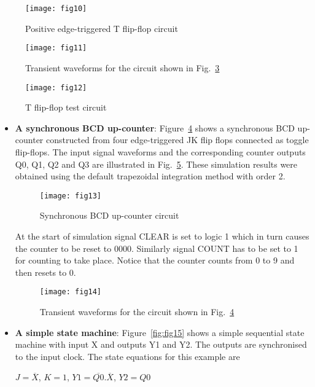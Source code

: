 \begin{figure}[ht]
  \centering
	\texttt{[image: fig10]}
        \caption{Positive edge-triggered T flip-flop circuit}
        \label{fig:fig10}
\end{figure} 

\begin{figure}[ht]
  \centering
  \texttt{[image: fig11]}
  \caption{Transient waveforms for the circuit shown in Fig.~\ref{fig:fig12}}
  \label{fig:fig11}
\end{figure}

\begin{figure}[ht]
  \centering
  \texttt{[image: fig12]}
  \caption{T flip-flop test circuit}
  \label{fig:fig12}
\end{figure}

\begin{itemize}
\item
\textbf{A synchronous BCD up-counter}:
Figure~\ref{fig:fig13} shows a synchronous BCD up-counter constructed
from four edge-triggered JK flip flops connected as toggle
flip-flops. The input signal waveforms and the corresponding counter
outputs Q0, Q1, Q2 and Q3 are illustrated in Fig.~\ref{fig:fig14}.
These simulation results were obtained using the default trapezoidal
integration method with order 2.

\begin{figure}[ht]
  \centering
	\texttt{[image: fig13]}
        \caption{Synchronous BCD up-counter circuit}
        \label{fig:fig13}
\end{figure} 

At the start of simulation signal CLEAR is set to logic 1 which in
turn causes the counter to be reset to 0000.  Similarly signal COUNT
has to be set to 1 for counting to take place. Notice that the counter
counts from 0 to 9 and then resets to 0.

\begin{figure}[ht]
  \centering
  \texttt{[image: fig14]}
  \caption{Transient waveforms for the circuit shown in Fig.~\ref{fig:fig13}}
  \label{fig:fig14}
\end{figure}

\item
\textbf{A simple state machine}:
Figure~\ref{fig:fig15} shows a simple sequential state machine with
input X and outputs Y1 and Y2.  The outputs are synchronised to the
input clock.  The state equations for this example are

\begin{center}
\begin{large}
$J = \overline{X}$,  $K=1$,  $Y1=\overline{Q0}.\overline{X}$, $Y2=Q0$
\end{large}
\end{center}
\end{itemize}

